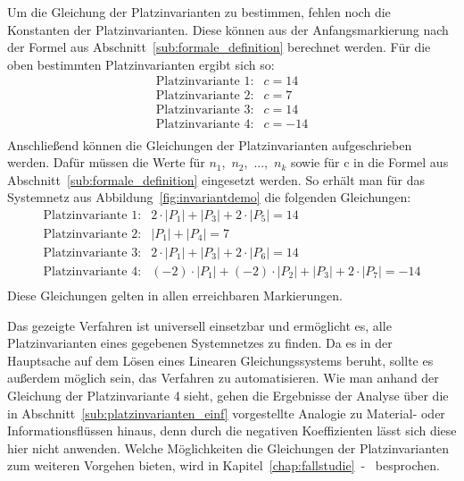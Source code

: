 		Um die Gleichung der Platzinvarianten zu bestimmen, fehlen noch die Konstanten der Platzinvarianten. Diese können aus der Anfangsmarkierung nach der Formel aus Abschnitt~\ref{sub:formale_definition} berechnet werden. Für die oben bestimmten Platzinvarianten ergibt sich so:
		$$
		\begin{matrix}
			\text{Platzinvariante 1}: & c = 14 	\\
			\text{Platzinvariante 2}: & c = 7 	\\
			\text{Platzinvariante 3}: & c = 14 	\\
			\text{Platzinvariante 4}: & c = -14 \\
		\end{matrix}
		$$
		Anschließend können die Gleichungen der Platzinvarianten aufgeschrieben werden. Dafür müssen die Werte für $n_1$,~$n_2$,~...,~$n_k$ sowie für c in die Formel aus Abschnitt~\ref{sub:formale_definition} eingesetzt werden. So erhält man für das Systemnetz aus Abbildung~\ref{fig:invariantdemo} die folgenden Gleichungen:
		$$
		\begin{matrix}
			\text{Platzinvariante 1}: & 2 \cdot |P_1| + |P_3| + 2 \cdot |P_5| = 14 \\
			\text{Platzinvariante 2}: & |P_1| + |P_4| = 7 \\
			\text{Platzinvariante 3}: & 2 \cdot |P_1| + |P_3| + 2 \cdot |P_6| = 14 \\
			\text{Platzinvariante 4}: & (-2) \cdot |P_1| + (-2) \cdot |P_2| + |P_3| + 2 \cdot |P_7|= -14 \\
		\end{matrix}
		$$
		Diese Gleichungen gelten in allen erreichbaren Markierungen.

		Das gezeigte Verfahren ist universell einsetzbar und ermöglicht es, alle Platzinvarianten eines gegebenen Systemnetzes zu finden. Da es in der Hauptsache auf dem Lösen eines Linearen Gleichungssystems beruht, sollte es außerdem möglich sein, das Verfahren zu automatisieren. Wie man anhand der Gleichung der Platzinvariante 4 sieht, gehen die Ergebnisse der Analyse über die in Abschnitt~\ref{sub:platzinvarianten_einf} vorgestellte Analogie zu Material- oder Informationsflüssen hinaus, denn durch die negativen Koeffizienten lässt sich diese hier nicht anwenden. Welche Möglichkeiten die Gleichungen der Platzinvarianten zum weiteren Vorgehen bieten, wird in Kapitel~\ref{chap:fallstudie}~-~ besprochen. 
